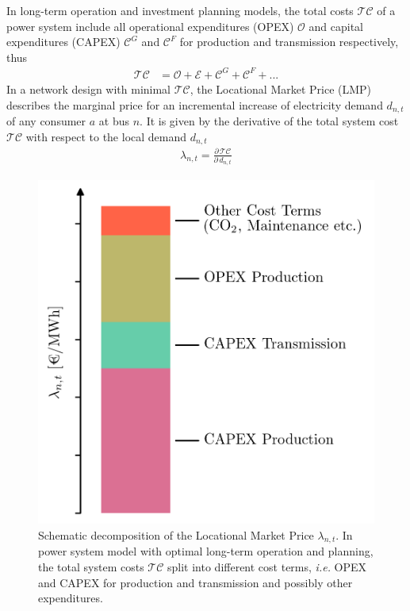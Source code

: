 \documentclass[11pt,twocolumn]{article}
\newcommand{\ie}{\textit{i.e.} }
\newcommand{\pdv}[2]{\frac{\partial #1}{\partial #2}}
\newcommand{\demand}[1][n]{d_{#1,t}}
\newcommand{\lmp}[1][n]{\lambda_{#1,t}}
\newcommand{\totalcost}{\mathcal{TC}}
\newcommand{\totalOpexGeneration}{\mathcal{O}}
\newcommand{\totalCapexGeneration}{\mathcal{C}^G}
\newcommand{\totalCapexFlow}{\mathcal{C}^F}
\newcommand{\totalEmissionCost}{\mathcal{E}}
\begin{document}
In long-term operation and investment planning models, the total costs $\totalcost$ of a power system include all operational expenditures (OPEX) $\totalOpexGeneration$ and capital expenditures (CAPEX) $\totalCapexGeneration$ and $\totalCapexFlow$ for production  and transmission respectively, thus
\begin{align}
\totalcost &= \totalOpexGeneration + \totalEmissionCost +  \totalCapexGeneration +  \totalCapexFlow + ...
\label{eq:total_cost_terms}
\end{align}
In a network design with minimal $\totalcost$, the Locational Market Price (LMP) describes the marginal price for an incremental increase of electricity demand $\demand$ of any consumer $a$ at bus $n$. It is given by the derivative of the total system cost $\totalcost$ with respect to the local demand $\demand$
\begin{align}
\lmp = \pdv{\,\totalcost}{\,\demand}
\label{eq:total_cost_derivative}
\end{align}
% 
\begin{figure}[h]
\centering
\includegraphics[width=.8\linewidth]{price_decomposition.png}
\caption{Schematic decomposition of the Locational Market Price $\lmp$. In power system model with optimal long-term operation and planning, the total system costs $\totalcost$ split into different cost terms, \ie OPEX and CAPEX for production and transmission and possibly other expenditures. }
\label{fig:price_decomposition}
\end{figure}
% 
\end{document}
